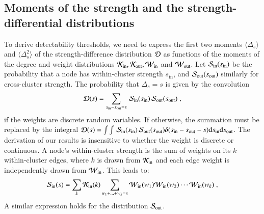 \documentclass[a4paper,pre,superscriptaddress,floatfix,nofootinbib,twocolumn]{revtex4-1}
\begin{document}
\subsection*{Moments of the strength and the strength-differential distributions}

To derive detectability thresholds, we need to express the first two moments $\langle \Delta_{s} \rangle$ and $\langle \Delta_{s}^2 \rangle$ of the strength-difference distribution ${\cal D}$
as functions of the moments of the degree and weight distributions $\cal K_\text{in}, \cal K_\text{out}, \cal W_\text{in} $ and $\cal W_\text{out} $.
Let ${\cal S}_\text{in}(s_\text{in})$ be the probability that a node has within-cluster strength $s_\text{in}$, and ${\cal S}_\text{out}(s_\text{out})$ similarly for cross-cluster strength.
The probability that $\Delta_{s} = s$ is given by the convolution
\begin{equation}
    {\cal D}(s) = \sum_{s_\text{in} - s_\text{out} = s} \,  {\cal S}_\text{in} (s_\text{in}) \, {\cal S}_\text{out} (s_\text{out}) \;,
\label{eq:conv2}
\end{equation}
if the weights are discrete random variables. If otherwise, the summation must be replaced by the integral ${\cal D}(s) = \int\int \,  {\cal S}_\text{in} (s_\text{in}) \, {\cal S}_\text{out} (s_\text{out}) \delta(s_\text{in} - s_\text{out}-s){\rm d}s_{\text{in}}{\rm d}s_{\text{out}}$.
The derivation of our results is insensitive to whether the weight is discrete or continuous.
A node's within-cluster strength is the sum of weights on its $k$ within-cluster edges, where $k$ is drawn from ${\cal K}_\text{in}$ and each edge weight is independently drawn from ${\cal W}_\text{in}$.
This leads to:
\begin{equation}
    {\cal S}_\text{in} (s) =
    \sum_{k} {\cal K}_\text{in}(k) \sum_{w_1 + \ldots + w_k = s} {\cal W}_\text{in}(w_1) {\cal W}_\text{in}(w_2) \cdots {\cal W}_\text{in}(w_k) \; ,
    \label{eq:conv1}
\end{equation}
A similar expression holds for the distribution ${\cal S}_\text{out}$.
\end{document}
